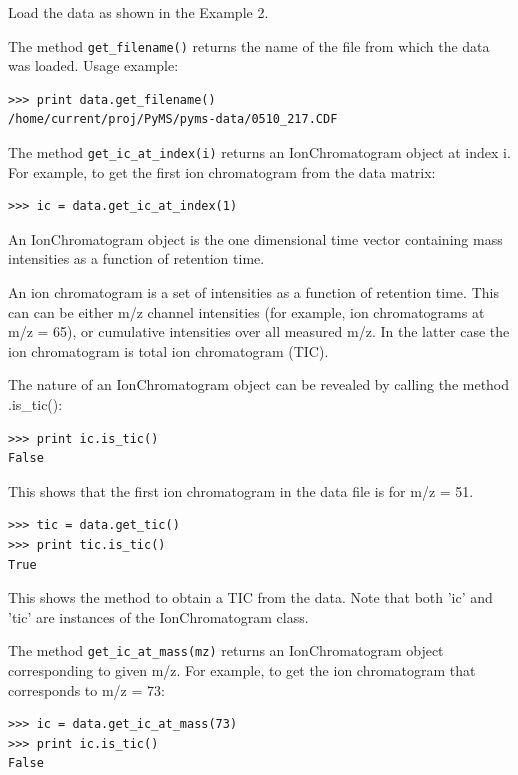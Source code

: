 Load the data as shown in the Example 2.

The method {\tt get\_filename()} returns the name of the file from which
the data was loaded. Usage example:

\begin{verbatim}
>>> print data.get_filename()
/home/current/proj/PyMS/pyms-data/0510_217.CDF
\end{verbatim}

The method {\tt get\_ic\_at\_index(i)} returns an IonChromatogram object
at index i. For example, to get the first ion chromatogram from the data
matrix:

\begin{verbatim}
>>> ic = data.get_ic_at_index(1)
\end{verbatim}

\noindent
An IonChromatogram object is the one dimensional time vector containing
mass intensities as a function of retention time.

An ion chromatogram is a set of intensities as a function of retention
time. This can can be either m/z channel intensities (for example, ion
chromatograms at m/z = 65), or cumulative intensities over all measured
m/z. In the latter case the ion chromatogram is total ion chromatogram
(TIC).

The nature of an IonChromatogram object can be revealed by calling
the method .is\_tic():

\begin{verbatim}
>>> print ic.is_tic()
False
\end{verbatim}

\noindent
This shows that the first ion chromatogram in the data file is for
m/z = 51.

\begin{verbatim}
>>> tic = data.get_tic()
>>> print tic.is_tic()
True
\end{verbatim}

\noindent
This shows the method to obtain a TIC from the data. Note that both
'ic' and 'tic' are instances of the IonChromatogram class.

The method {\tt get\_ic\_at\_mass(mz)} returns an IonChromatogram
object corresponding to given m/z. For example, to get the ion
chromatogram that corresponds to m/z = 73:

\begin{verbatim}
>>> ic = data.get_ic_at_mass(73)
>>> print ic.is_tic()
False
\end{verbatim}

